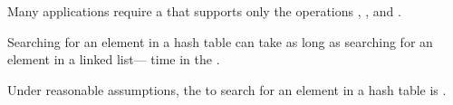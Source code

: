 \documentclass[UTF8,11pt]{beamer}
\begin{document}
\begin{frame}
\begin{block}{}
	\begin{center}
		Many applications require a \textbf{} that supports only the \textbf{} operations , , and .
	\end{center}
\end{block}
\pause
\begin{block}{}
	\begin{center}
 	Searching for an element in a hash table can take as long as searching for an element in a linked list—  time in the . 
	\end{center}
\end{block}
\pause
\begin{block}{}
	\begin{center}
	 Under reasonable assumptions, the  to search for an element in a hash table is .
	\end{center}
\end{block}
\end{frame}
\end{document}

